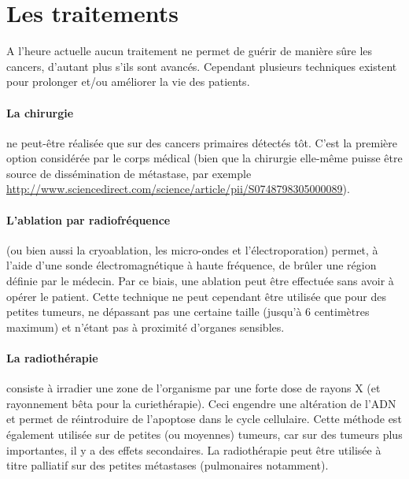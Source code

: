 \documentclass[main.tex]{subfiles}
\begin{document}
\section{Les traitements}
A l'heure actuelle aucun traitement ne permet de guérir de manière sûre les cancers, d'autant plus s'ils sont avancés. Cependant plusieurs techniques existent pour prolonger et/ou améliorer la vie des patients.
\paragraph{La chirurgie} ne peut-être réalisée que sur des cancers primaires %
détectés tôt. C'est la première option considérée par le corps médical (bien que la chirurgie elle-même puisse être source de dissémination de métastase, \cf par exemple  \url{http://www.sciencedirect.com/science/article/pii/S0748798305000089}).

\paragraph{L'ablation par radiofréquence} (ou bien aussi la cryoablation, les micro-ondes et l'électroporation) permet, à l'aide d'une sonde électromagnétique à haute fréquence, de brûler une région définie par le médecin. Par ce biais, une ablation peut être effectuée sans avoir à opérer le patient. 
Cette technique ne peut cependant être utilisée que pour des petites tumeurs, ne dépassant pas une certaine taille (jusqu'à 6 centimètres maximum) et n'étant pas à proximité d'organes sensibles. 

\paragraph{La radiothérapie} consiste à irradier une zone de l'organisme par une forte dose de rayons X (et rayonnement bêta pour la curiethérapie). 
Ceci engendre une altération de l'ADN et permet de réintroduire de l'apoptose dans le cycle cellulaire. 
Cette méthode est également utilisée sur de petites (ou moyennes) tumeurs, car sur des tumeurs plus importantes, il y a des effets secondaires. 
La radiothérapie peut être %
utilisée à titre palliatif sur des petites métastases (pulmonaires notamment).
\end{document}
